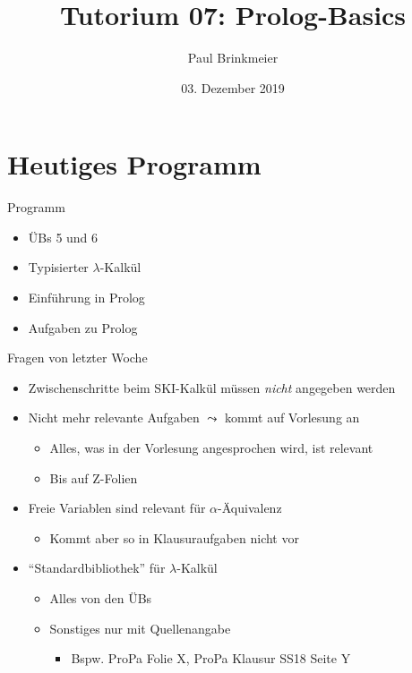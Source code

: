 \documentclass{beamer}
\title{Tutorium 07: Prolog-Basics}
\author{Paul Brinkmeier}
\institute{Tutorium Programmierparadigmen am KIT}
\date{03. Dezember 2019}
\begin{document}
\begin{frame}
	\titlepage
\end{frame}

\section{Heutiges Programm}

\begin{frame}{Programm}
	\begin{itemize}
		\item ÜBs 5 und 6
		\item Typisierter $\lambda$-Kalkül
		\item Einführung in Prolog
		\item Aufgaben zu Prolog
	\end{itemize}
\end{frame}

\begin{frame}{Fragen von letzter Woche}
	\begin{itemize}
		\item Zwischenschritte beim SKI-Kalkül müssen \emph{nicht} angegeben werden
		\pause
		\item Nicht mehr relevante Aufgaben $\leadsto$ kommt auf Vorlesung an
		\begin{itemize}
			\item Alles, was in der Vorlesung angesprochen wird, ist relevant
			\pause
			\item Bis auf Z-Folien
		\end{itemize}
		\pause
		\item Freie Variablen sind relevant für $\alpha$-Äquivalenz
		\begin{itemize}
			\item Kommt aber so in Klausuraufgaben nicht vor
		\end{itemize}
		\pause
		\item \enquote{Standardbibliothek} für $\lambda$-Kalkül
		\begin{itemize}
			\item Alles von den ÜBs
			\item Sonstiges nur mit Quellenangabe
			\begin{itemize}
				\item Bspw. ProPa Folie X, ProPa Klausur SS18 Seite Y
			\end{itemize}
		\end{itemize}
	\end{itemize}
\end{frame}
\end{document}
